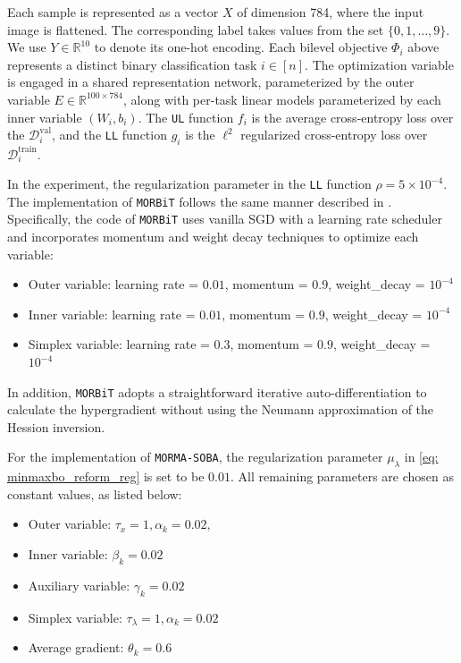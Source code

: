 \documentclass[10pt]{article}
\theoremstyle{remark}
\newcommand{\cD}{\mathcal{D}}
\newcommand{\realset}{\mathbb{R}}
\begin{document}
Each sample is represented as a vector $X$ of dimension 784, where the input image is flattened. The corresponding label takes values from the set $\{0,1,\dots,9\}$. We use $Y\in\realset^{10}$ to denote its one-hot encoding. Each bilevel objective $\Phi_i$ above represents a distinct binary classification task $i\in[n]$. The optimization variable is engaged in a shared representation network, parameterized by the outer variable $E\in\realset^{100\times 784}$, along with per-task linear models parameterized by each inner variable $(W_i, b_i)$. The \texttt{UL} function $f_i$ is the average cross-entropy loss over the $\cD_{i}^{\text{val}}$, and the \texttt{LL} function $g_i$ is the $\ell^2$ regularized cross-entropy loss over $\cD_i^{\text{train}}$. 

In the experiment, the regularization parameter in the \texttt{LL} function $\rho=5\times 10^{-4}$. The implementation of \texttt{MORBiT} follows the same manner described in \cite{gu2022min}. Specifically, the code of \texttt{MORBiT} \cite{gu2022min} uses vanilla SGD with a learning rate scheduler and incorporates momentum and weight decay techniques to optimize each variable:
\begin{itemize}
    \item Outer variable: learning rate = $0.01$, momentum = $0.9$, weight\_decay = $10^{-4}$
    \item Inner variable: learning rate = $0.01$, momentum = $0.9$, weight\_decay = $10^{-4}$
    \item Simplex variable: learning rate = $0.3$, momentum = $0.9$, weight\_decay = $10^{-4}$
\end{itemize}
In addition, \texttt{MORBiT} adopts a straightforward iterative auto-differentiation to calculate the hypergradient without using the Neumann approximation of the Hession inversion.

For the implementation of \texttt{MORMA-SOBA}, the regularization parameter $\mu_{\lambda}$ in \ref{eq: minmaxbo_reform_reg} is set to be $0.01$. All remaining parameters are chosen as constant values, as listed below:
\begin{itemize}
    \item Outer variable: $\tau_x= 1, \alpha_k = 0.02,$
    \item Inner variable: $\beta_k = 0.02$
    \item Auxiliary variable: $\gamma_k=0.02$
    \item Simplex variable: $\tau_\lambda = 1, \alpha_k = 0.02$
    \item Average gradient: $\theta_k=0.6$
\end{itemize}
\end{document}
